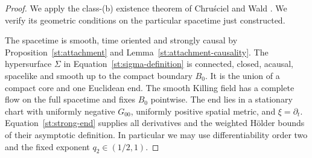 \begin{proof}
We apply the class-(b) existence theorem of Chru\'sciel and Wald
\cite[Definitions 2.1, 2.3 and 2.4, Equation (4.1),
Theorem 4.2]{ChruscielWald1994}.  We verify its geometric conditions
on the particular spacetime just constructed.

The spacetime is smooth, time oriented and strongly causal by
Proposition~\ref{st:attachment} and
Lemma~\ref{st:attachment-causality}.  The hypersurface $\Sigma$
in Equation~\eqref{st:sigma-definition} is connected, closed,
acausal, spacelike and smooth up to the compact boundary $B_0$.
It is the union of a compact core and one Euclidean end.  The
smooth Killing field has a complete flow on the full spacetime
and fixes $B_0$ pointwise.  The end lies in a stationary chart with
uniformly negative $G_{00}$, uniformly positive spatial metric,
and $\xi=\partial_t$.  Equation~\eqref{st:strong-end} supplies
all derivatives and the weighted H\"older bounds of their
asymptotic definition.  In particular we may use differentiability
order two and the fixed exponent $q_2\in(1/2,1)$.


\end{proof}
